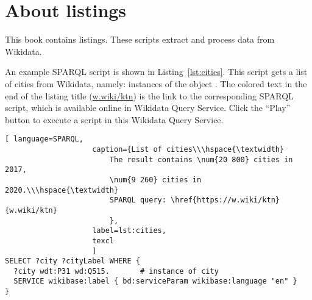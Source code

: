 
\section{About listings}

This book contains  listings.
These scripts extract and process data from Wikidata.%

An example SPARQL script is shown in Listing~\ref{lst:cities}. 
This script gets a list of cities from Wikidata, 
namely: instances of the object .
The colored text in the end of the listing title 
(\href{https://w.wiki/ktn}{w.wiki/ktn}) 
is the link to the corresponding SPARQL script,  
which is available online in Wikidata Query Service. 
Click the ``Play'' button to execute a script in this Wikidata Query Service. 

\begin{lstlisting}[ language=SPARQL, 
                    caption={List of cities\\\hspace{\textwidth}
                        The result contains \num{20 800} cities in 2017, 
                        \num{9 260} cities in 2020.\\\hspace{\textwidth}
                        SPARQL query: \href{https://w.wiki/ktn}{w.wiki/ktn}
                        },
                    label=lst:cities,
                    texcl 
                    ]
SELECT ?city ?cityLabel WHERE { 
  ?city wdt:P31 wd:Q515.       # instance of city 
  SERVICE wikibase:label { bd:serviceParam wikibase:language "en" }
}
\end{lstlisting}%



